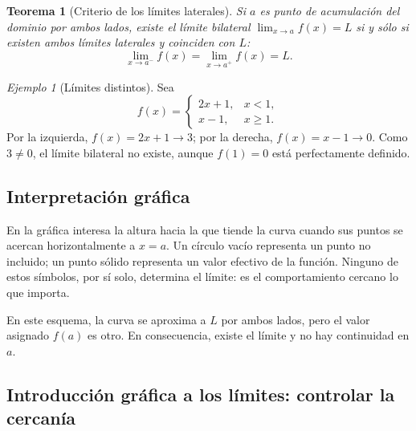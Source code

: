 \documentclass[12pt]{article}
\newtheorem{teorema}[definicion]{Teorema}
\theoremstyle{remark}
\newtheorem{ejemplo}{Ejemplo}
\begin{document}
\begin{teorema}[Criterio de los límites laterales]
Si $a$ es punto de acumulación del dominio por ambos lados, existe el límite bilateral $\lim_{x\to a}f(x)=L$ si y sólo si existen ambos límites laterales y coinciden con $L$:
\[
\boxed{\lim_{x\to a^-}f(x)=\lim_{x\to a^+}f(x)=L.}
\]
\end{teorema}

\begin{ejemplo}[Límites distintos]
Sea
\[
f(x)=\begin{cases}
 2x+1,&x<1,\\
 x-1,&x\ge1.
\end{cases}
\]
Por la izquierda, $f(x)=2x+1\to3$; por la derecha, $f(x)=x-1\to0$. Como $3\ne0$, el límite bilateral no existe, aunque $f(1)=0$ está perfectamente definido.
\end{ejemplo}
\subsection*{Interpretación gráfica}
En la gráfica interesa la altura hacia la que tiende la curva cuando sus puntos se acercan horizontalmente a $x=a$. Un círculo vacío representa un punto no incluido; un punto sólido representa un valor efectivo de la función. Ninguno de estos símbolos, por sí solo, determina el límite: es el comportamiento cercano lo que importa.

\begin{center}
\end{center}
En este esquema, la curva se aproxima a $L$ por ambos lados, pero el valor asignado $f(a)$ es otro. En consecuencia, existe el límite y no hay continuidad en $a$.

\subsection*{Introducción gráfica a los límites: controlar la cercanía}
\end{document}
